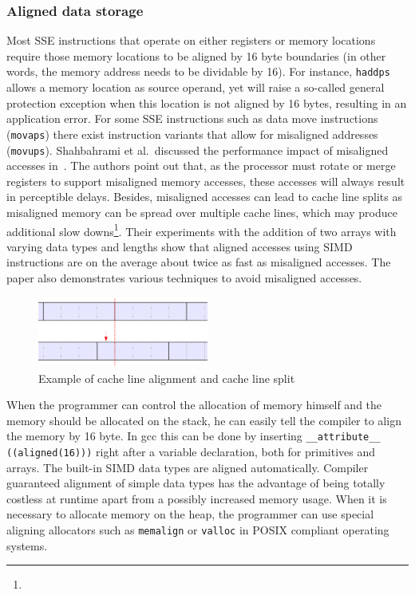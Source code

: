 \subsubsection{Aligned data storage} 
Most SSE instructions that operate on either registers or memory locations require those memory locations to be aligned by 16 byte boundaries (in other words, the memory address needs to be dividable by 16). For instance, \texttt{haddps} allows a memory location as source operand, yet will raise a so-called general protection exception when this location is not aligned by 16 bytes, resulting in an application error. For some SSE instructions such as data move instructions (\texttt{movaps}) there exist instruction variants that allow for misaligned addresses (\eg\texttt{movups}). Shahbahrami et al.\ discussed the performance impact of misaligned accesses in~\cite{shahbahrami2006misaligned}. The authors point out that, as the processor must rotate or merge registers to support misaligned memory accesses, these accesses will always result in perceptible delays. Besides, misaligned accesses can lead to cache line splits as misaligned memory can be spread over multiple cache lines, which may produce additional slow downs\footnote{}. Their experiments with the addition of two arrays with varying data types and lengths show that aligned accesses using SIMD instructions are on the average about twice as fast as misaligned accesses. The paper also demonstrates various techniques to avoid misaligned accesses.

\begin{figure}[h]
\begin{center}
\includegraphics[width=0.5\textwidth]{img/cachelinesplit.eps}
\end{center}
\caption{Example of cache line alignment and cache line split}
\label{fig:cachelinesplit}
\end{figure}

When the programmer can control the allocation of memory himself and the memory should be allocated on the stack, he can easily tell the compiler to align the memory by 16 byte. In gcc this can be done by inserting \texttt{\_\_attribute\_\_ ((aligned(16)))} right after a variable declaration, both for primitives and arrays. The built-in SIMD data types are aligned automatically. Compiler guaranteed alignment of simple data types has the advantage of being totally costless at runtime apart from a possibly increased memory usage. When it is necessary to allocate memory on the heap, the programmer can use special aligning allocators such as \texttt{memalign} or \texttt{valloc} in POSIX compliant operating systems. 


